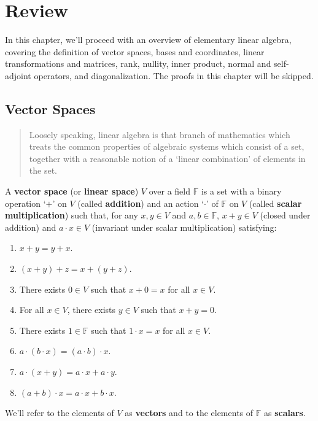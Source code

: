 \chapter{Review}

In this chapter, we'll proceed with an overview of elementary linear algebra, covering the definition of vector spaces, bases and coordinates, linear transformations and matrices, rank, nullity, inner product, normal and self-adjoint operators, and diagonalization. The proofs in this chapter will be skipped.

\section{Vector Spaces}

\begin{quote}
	Loosely speaking, linear algebra is that branch of mathematics which treats the common properties of algebraic systems which consist of a set, together with a reasonable notion of a `linear combination' of elements in the set.
\end{quote}

\begin{definition}
	A \textbf{vector space} (or \textbf{linear space}) $V$ over a field $\mathbb{F}$ is a set with a binary operation `$+$' on $V$ (called \textbf{addition}) and an action `$\cdot$' of $\mathbb{F}$ on $V$ (called \textbf{scalar multiplication}) such that, for any $x,y \in V$ and $a, b \in \mathbb{F}$, $x+y \in V$ (closed under addition) and $a\cdot x \in V$ (invariant under scalar multiplication) satisfying:
	\begin{enumerate}
		\item $x+y = y+x$.
		\item $(x+y)+z = x + (y+z)$.
		\item There exists $0 \in V$ such that $x+ 0 = x$ for all $x \in V$.
		\item For all $x \in V$, there exists $y \in V$ such that $x+y = 0$.
		\item There exists $1 \in \mathbb{F}$ such that $1 \cdot x = x$ for all $x \in V$. 
		\item $a \cdot (b \cdot x) = (a \cdot b) \cdot x$. 
		\item $a \cdot (x + y) = a \cdot x + a \cdot y$.
		\item $(a+b)\cdot x = a \cdot x + b \cdot x$.
	\end{enumerate}
	
	We'll refer to the elements of $V$ as \textbf{vectors} and to the elements of $\mathbb{F}$ as \textbf{scalars}.
\end{definition}


